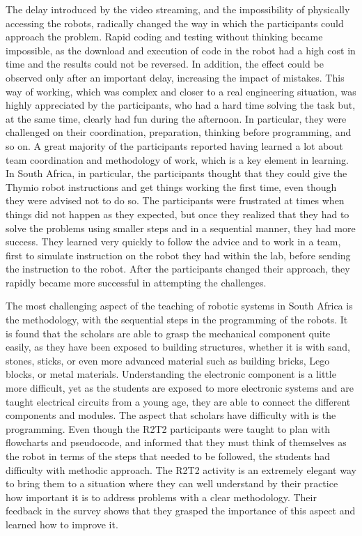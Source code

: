 \documentclass{intech-journal}
\begin{document}
The delay introduced by the video streaming, and the impossibility of physically accessing the robots, radically changed the way in which the participants could approach the problem.
Rapid coding and testing without thinking became impossible, as the download and execution of code in the robot had a high cost in time and the results could not be reversed. 
In addition, the effect could be observed only after an important delay, increasing the impact of mistakes.
This way of working, which was complex and closer to a real engineering situation, was highly appreciated by the participants, who had a hard time solving the task but, at the same time, clearly had fun during the afternoon.
In particular, they were challenged on their coordination, preparation, thinking before programming, and so on. 
A great majority of the participants reported having learned a lot about team coordination and methodology of work, which is a key element in learning.
In South Africa, in particular, the participants thought that they could give the Thymio robot instructions and get things working the first time, even though they were advised not to do so. 
The participants were frustrated at times when things did not happen as they expected, but once they realized that they had to solve the problems using smaller steps and in a sequential manner, they had more success. 
They learned very quickly to follow the advice and to work in a team, first to simulate instruction on the robot they had within the lab, before sending the instruction to the robot.
After the participants changed their approach, they rapidly became more successful in attempting the challenges. 

The most challenging aspect of the teaching of robotic systems in South Africa is the methodology, with the sequential steps in the programming of the robots. 
It is found that the scholars are able to grasp the mechanical component quite easily, as they have been exposed to building structures, whether it is with sand, stones, sticks, or even more advanced material such as building bricks, Lego blocks, or metal materials. 
Understanding the electronic component is a little more difficult, yet as the students are exposed to more electronic systems and are taught electrical circuits from a young age, they are able to connect the different components and modules. 
The aspect that scholars have difficulty with is the programming. 
Even though the R2T2 participants were taught to plan with flowcharts and pseudocode, and informed that they must think of themselves as the robot in terms of the steps that needed to be followed, the students had difficulty with methodic approach. 
The R2T2 activity is an extremely elegant way to bring them to a situation where they can well understand by their practice how important it is to address problems with a clear methodology. 
Their feedback in the survey shows that they grasped the importance of this aspect and learned how to improve it.
\end{document}
